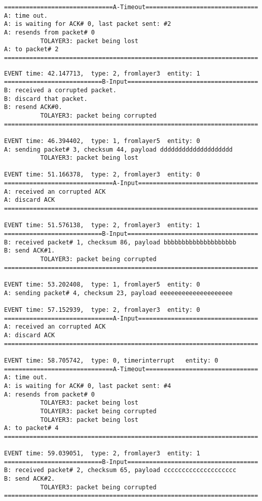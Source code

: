 \documentclass[12pt]{article}
\begin{document}
\begin{Verbatim}[frame=single, rulecolor=\color{red}, label=Handle loss/timeout] 
==============================A-Timeout===============================
A: time out. 
A: is waiting for ACK# 0, last packet sent: #2
A: resends from packet# 0 
          TOLAYER3: packet being lost
A: to packet# 2
======================================================================
\end{Verbatim}
\begin{verbatim}
EVENT time: 42.147713,  type: 2, fromlayer3  entity: 1
===========================B-Input====================================
B: received a corrupted packet.
B: discard that packet.
B: resend ACK#0.
          TOLAYER3: packet being corrupted
======================================================================

EVENT time: 46.394402,  type: 1, fromlayer5  entity: 0
A: sending packet# 3, checksum 44, payload dddddddddddddddddddd
          TOLAYER3: packet being lost

EVENT time: 51.166378,  type: 2, fromlayer3  entity: 0
==============================A-Input=================================
A: received an corrupted ACK 
A: discard ACK
======================================================================

EVENT time: 51.576138,  type: 2, fromlayer3  entity: 1
===========================B-Input====================================
B: received packet# 1, checksum 86, payload bbbbbbbbbbbbbbbbbbbb
B: send ACK#1.
          TOLAYER3: packet being corrupted
======================================================================

EVENT time: 53.202408,  type: 1, fromlayer5  entity: 0
A: sending packet# 4, checksum 23, payload eeeeeeeeeeeeeeeeeeee

EVENT time: 57.152939,  type: 2, fromlayer3  entity: 0
==============================A-Input=================================
A: received an corrupted ACK 
A: discard ACK
======================================================================

EVENT time: 58.705742,  type: 0, timerinterrupt   entity: 0
==============================A-Timeout===============================
A: time out. 
A: is waiting for ACK# 0, last packet sent: #4
A: resends from packet# 0 
          TOLAYER3: packet being lost
          TOLAYER3: packet being corrupted
          TOLAYER3: packet being lost
A: to packet# 4
======================================================================

EVENT time: 59.039051,  type: 2, fromlayer3  entity: 1
===========================B-Input====================================
B: received packet# 2, checksum 65, payload cccccccccccccccccccc
B: send ACK#2.
          TOLAYER3: packet being corrupted
======================================================================
\end{verbatim}
\end{document}
